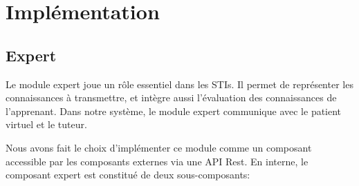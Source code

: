 
\chapter{Implémentation}
\label{chp:impl}




\section{Expert}
Le module expert joue un rôle essentiel dans les STIs. Il permet de représenter les connaissances à transmettre, et intègre aussi l'évaluation des connaissances de l'apprenant.
Dans notre système, le module expert communique avec le patient virtuel et le tuteur.

Nous avons fait le choix d'implémenter ce module comme un composant accessible par les composants externes via une API Rest.
En interne, le composant expert est constitué de deux sous-composants:


